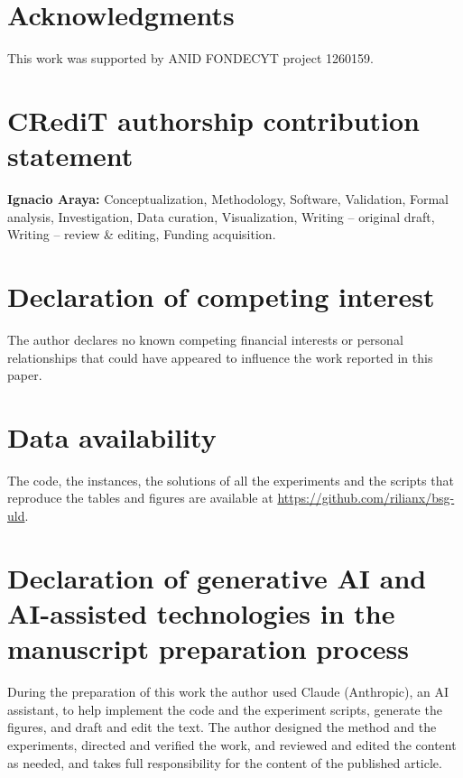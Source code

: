 \documentclass[preprint,12pt,authoryear]{elsarticle}
\begin{document}
\section*{Acknowledgments}
This work was supported by ANID FONDECYT project 1260159.

\section*{CRediT authorship contribution statement}
\textbf{Ignacio Araya:} Conceptualization, Methodology, Software, Validation, Formal analysis,
Investigation, Data curation, Visualization, Writing -- original draft, Writing -- review \&
editing, Funding acquisition.

\section*{Declaration of competing interest}
The author declares no known competing financial interests or personal relationships that could
have appeared to influence the work reported in this paper.

\section*{Data availability}
The code, the instances, the solutions of all the experiments and the scripts that reproduce the
tables and figures are available at \url{https://github.com/rilianx/bsg-uld}.

\section*{Declaration of generative AI and AI-assisted technologies in the manuscript preparation process}
During the preparation of this work the author used Claude (Anthropic), an AI assistant, to help
implement the code and the experiment scripts, generate the figures, and draft and edit the text.
The author designed the method and the experiments, directed and verified the work, and reviewed
and edited the content as needed, and takes full responsibility for the content of the published
article.



\end{document}
